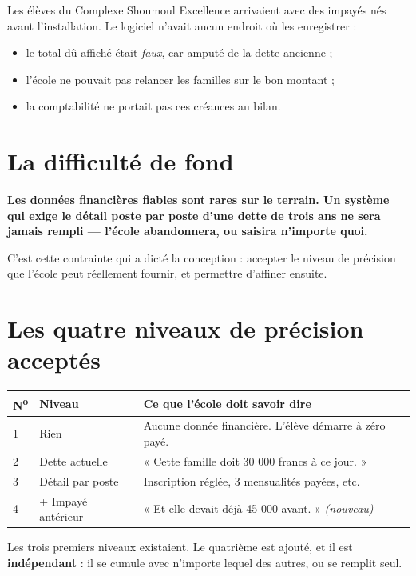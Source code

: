 \documentclass[11pt,a4paper]{report}
\newcommand{\encadre}[2]{%
  \begingroup
  \setlength{\fboxsep}{9pt}%
  \noindent\colorbox{sagibg}{%
    \begin{minipage}{\dimexpr\linewidth-2\fboxsep\relax}
    \textbf{\color{#1}#2}
    \end{minipage}}%
  \par\vspace{8pt}
  \endgroup}
\newcommand{\alerte}[1]{\encadre{sagired}{#1}}
\begin{document}
Les élèves du Complexe Shoumoul Excellence arrivaient avec des impayés nés
avant l'installation. Le logiciel n'avait aucun endroit où les enregistrer :

\begin{itemize}
\item le total dû affiché était \emph{faux}, car amputé de la dette ancienne ;
\item l'école ne pouvait pas relancer les familles sur le bon montant ;
\item la comptabilité ne portait pas ces créances au bilan.
\end{itemize}

\section{La difficulté de fond}

\alerte{Les données financières fiables sont rares sur le terrain. Un système
qui exige le détail poste par poste d'une dette de trois ans ne sera jamais
rempli --- l'école abandonnera, ou saisira n'importe quoi.}

C'est cette contrainte qui a dicté la conception : accepter le niveau de
précision que l'école peut réellement fournir, et permettre d'affiner ensuite.

\section{Les quatre niveaux de précision acceptés}

\begin{center}
\begin{tabularx}{\linewidth}{@{}p{0.5cm}p{4.2cm}X@{}}
\toprule
\textbf{N\textsuperscript{o}} & \textbf{Niveau} & \textbf{Ce que l'école doit savoir dire} \\
\midrule
1 & Rien & Aucune donnée financière. L'élève démarre à zéro payé. \\
2 & Dette actuelle & « Cette famille doit 30 000 francs à ce jour. » \\
3 & Détail par poste & Inscription réglée, 3 mensualités payées, etc. \\
4 & + Impayé antérieur & « Et elle devait déjà 45 000 avant. » \emph{(nouveau)} \\
\bottomrule
\end{tabularx}
\end{center}

Les trois premiers niveaux existaient. Le quatrième est ajouté, et il est
\textbf{indépendant} : il se cumule avec n'importe lequel des autres, ou se
remplit seul.
\end{document}

